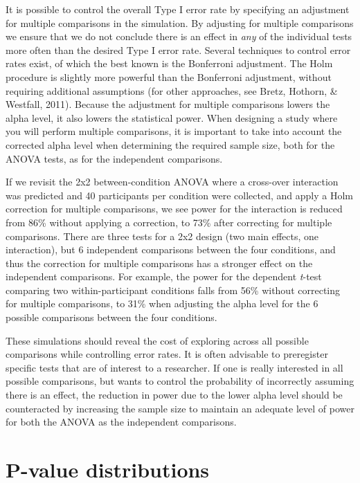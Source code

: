 \documentclass[,jou,floatsintext]{apa6}
\begin{document}
It is possible to control the overall Type I error rate by specifying an adjustment for multiple comparisons in the simulation.
By adjusting for multiple comparisons we ensure that we do not conclude there is an effect in \emph{any} of the individual tests more often than the desired Type I error rate.
Several techniques to control error rates exist, of which the best known is the Bonferroni adjustment.
The Holm procedure is slightly more powerful than the Bonferroni adjustment, without requiring additional assumptions (for other approaches, see Bretz, Hothorn, \& Westfall, 2011).
Because the adjustment for multiple comparisons lowers the alpha level, it also lowers the statistical power.
When designing a study where you will perform multiple comparisons, it is important to take into account the corrected alpha level when determining the required sample size, both for the ANOVA tests, as for the independent comparisons.

If we revisit the 2x2 between-condition ANOVA where a cross-over interaction was predicted and 40 participants per condition were collected, and apply a Holm correction for multiple comparisons, we see power for the interaction is reduced from 86\% without applying a correction, to 73\% after correcting for multiple comparisons.
There are three tests for a 2x2 design (two main effects, one interaction), but 6 independent comparisons between the four conditions, and thus the correction for multiple comparisons has a stronger effect on the independent comparisons.
For example, the power for the dependent \emph{t}-test comparing two within-participant conditions falls from 56\% without correcting for multiple comparisons, to 31\% when adjusting the alpha level for the 6 possible comparisons between the four conditions.

These simulations should reveal the cost of exploring across all possible comparisons while controlling error rates.
It is often advisable to preregister specific tests that are of interest to a researcher.
If one is really interested in all possible comparisons, but wants to control the probability of incorrectly assuming there is an effect, the reduction in power due to the lower alpha level should be counteracted by increasing the sample size to maintain an adequate level of power for both the ANOVA as the independent comparisons.

\hypertarget{p-value-distributions}{%
\section{P-value distributions}\label{p-value-distributions}}
\end{document}
